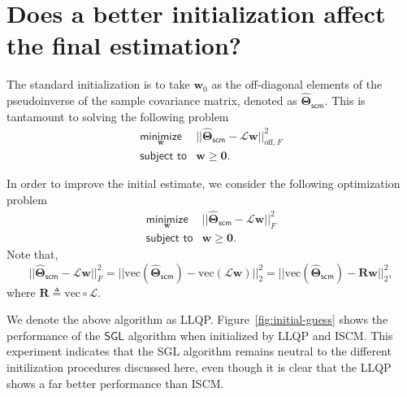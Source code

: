 \section{Does a better initialization affect the final estimation?}
The standard initialization is to take $\mathbf{w}_0$ as the off-diagonal elements of the
pseudoinverse of the sample covariance matrix, denoted as $\hat{\boldsymbol{\Theta}}_{\textsf{scm}}$.
This is tantamount to solving the following problem
$$\begin{array}{ll}
  \underset{\mathbf{w}}{\textsf{minimize}} & ||\hat{\boldsymbol{\Theta}}_{\textsf{scm}} - \mathcal{L}\mathbf{w}||^{2}_{\text{off}, F}\\
  \textsf{subject to} & \mathbf{w} \geq \mathbf{0}.
\end{array}$$

In order to improve the initial estimate, we consider the following optimization problem
\begin{equation}
\begin{array}{ll}
  \underset{\mathbf{w}}{\textsf{minimize}} & ||\hat{\boldsymbol{\Theta}}_{\textsf{scm}} - \mathcal{L}\mathbf{w}||^{2}_{F}\\
  \textsf{subject to} & \mathbf{w} \geq \mathbf{0}.
\end{array}
\end{equation}
Note that,
\begin{equation}
||\hat{\boldsymbol{\Theta}}_{\textsf{scm}} - \mathcal{L}\mathbf{w}||^{2}_{F} =
||\text{vec}\left(\hat{\boldsymbol{\Theta}}_{\textsf{scm}}\right) - \text{vec}(\mathcal{L}\mathbf{w})||^{2}_{2} =
||\text{vec}\left(\hat{\boldsymbol{\Theta}}_{\textsf{scm}}\right) - \mathbf{R}\mathbf{w}||^{2}_{2},
\end{equation}
where $\mathbf{R}\triangleq \text{vec}\circ \mathcal{L}$.

We denote the above algorithm as \textsf{LLQP}. Figure~\ref{fig:initial-guess} shows the performance of the
$\textsf{SGL}$ algorithm when initialized by \textsf{LLQP} and \textsf{ISCM}. This experiment indicates that
the \textsf{SGL} algorithm remains neutral to the different initilization procedures discussed here, even though
it is clear that the \textsf{LLQP} shows a far better performance than \textsf{ISCM}.

